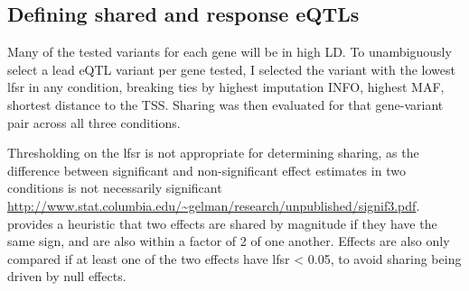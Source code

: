 \subsection{Defining shared and response eQTLs}

Many of the tested variants for each gene will be in high \gls{LD}.
To unambiguously select a lead \gls{eQTL} variant per gene tested, I selected the variant with the lowest lfsr in any condition, breaking ties by highest imputation INFO, highest \gls{MAF}, shortest distance to the \gls{TSS}.
Sharing was then evaluated for that gene-variant pair across all three conditions.

Thresholding on the lfsr is not appropriate for determining sharing, as the difference between significant and non-significant effect estimates in two conditions is not necessarily significant \url{http://www.stat.columbia.edu/~gelman/research/unpublished/signif3.pdf}.
\autocite{urbut2018FlexibleStatisticalMethods} provides a heuristic that two effects are shared by magnitude if they have the same sign, and are also within a factor of 2 of one another.
Effects are also only compared if at least one of the two effects have lfsr < 0.05, to avoid sharing being driven by null effects.
%
%
